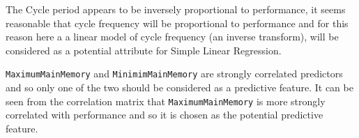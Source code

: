 \documentclass[12pt]{article}
\newenvironment{Shaded}{\begin{snugshade}}{\end{snugshade}}
\newcommand{\CharTok}[1]{\textcolor[rgb]{0.31,0.60,0.02}{#1}}
\newcommand{\CommentTok}[1]{\textcolor[rgb]{0.56,0.35,0.01}{\textit{#1}}}
\newcommand{\DataTypeTok}[1]{\textcolor[rgb]{0.13,0.29,0.53}{#1}}
\newcommand{\DecValTok}[1]{\textcolor[rgb]{0.00,0.00,0.81}{#1}}
\newcommand{\KeywordTok}[1]{\textcolor[rgb]{0.13,0.29,0.53}{\textbf{#1}}}
\newcommand{\NormalTok}[1]{#1}
\newcommand{\OperatorTok}[1]{\textcolor[rgb]{0.81,0.36,0.00}{\textbf{#1}}}
\newcommand{\OtherTok}[1]{\textcolor[rgb]{0.56,0.35,0.01}{#1}}
\newcommand{\StringTok}[1]{\textcolor[rgb]{0.31,0.60,0.02}{#1}}
\begin{document}
The Cycle period appears to be inversely proportional to performance, it
seems reasonable that cycle frequency will be proportional to
performance and for this reason here a a linear model of cycle frequency
(an inverse transform), will be considered as a potential attribute for
Simple Linear Regression.

\texttt{MaximumMainMemory} and \texttt{MinimimMainMemory} are strongly
correlated predictors and so only one of the two should be considered as
a predictive feature. It can be seen from the correlation matrix that
\texttt{MaximumMainMemory} is more strongly correlated with performance
and so it is chosen as the potential predictive feature.

\begin{Shaded}
\end{Shaded}
\end{document}
